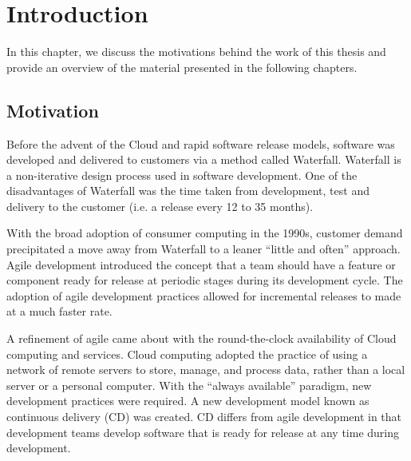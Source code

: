 

\chapter{Introduction}\label{ch:intro}

\begin{textsl}
{\small In this chapter, we discuss the motivations behind the work of this thesis and provide an overview of the material presented in the following chapters.}
\end{textsl}

\vspace*{1cm}

\section{Motivation}
Before the advent of the Cloud and rapid software release models, software was developed and delivered to customers via a method called Waterfall. Waterfall is a non-iterative design process used in software development. One of the disadvantages of Waterfall was the time taken from development, test and delivery to the customer (i.e. a release every 12 to 35 months).

With the broad adoption of consumer computing in the 1990s, customer demand precipitated a move away from Waterfall to a leaner ``little and often'' approach. Agile development introduced the concept that a team should have a feature or component ready for release at periodic stages during its development cycle. The adoption of agile development practices allowed for incremental releases to made at a much faster rate.

A refinement of agile came about with the round-the-clock availability of Cloud computing and services. Cloud computing adopted the practice of using a network of remote servers to store, manage, and process data, rather than a local server or a personal computer. With the ``always available'' paradigm, new development practices were required. A new development model known as continuous delivery (CD) was created. CD differs from agile development in that development teams develop software that is ready for release at any time during development.

